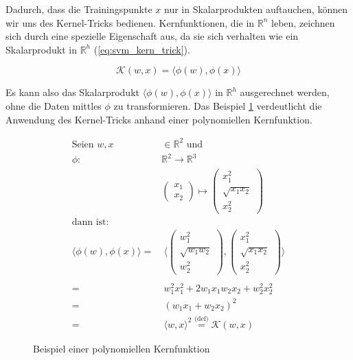 Dadurch, dass die Trainingspunkte $x$ nur in Skalarprodukten auftauchen, können wir uns des Kernel-Tricks bedienen.
Kernfunktionen, die in $\mathbb{R}^n$ leben, zeichnen sich durch eine spezielle Eigenschaft aus, da sie sich verhalten wie ein Skalarprodukt in $\mathbb{R}^h$ (\ref{eq:svm_kern_trick}). 

\begin{equation}
\label{eq:svm_kern_trick}
    \mathcal{K}(w,x) = \langle\phi(w),\phi(x)\rangle
\end{equation}

Es kann also das Skalarprodukt $\langle\phi(w),\phi(x)\rangle$ in $\mathbb{R}^h$ ausgerechnet werden, ohne die Daten mittles $\phi$ zu transformieren. 
Das Beispiel \ref{fig:ex_kernel} verdeutlicht die Anwendung des Kernel-Tricks  anhand einer polynomiellen Kernfunktion.

\renewcommand{\figurename}{Bsp.}
\begin{figure}[htbp]
\begin{equation*}
\label{eq:svm_kernel_example}
\begin{split}
    \text{Seien } w,x & \in \mathbb{R}^2 \text{ und}\\
    \phi : & \mathbb{R}^2 \to \mathbb{R}^3\\
    & \begin{pmatrix}
    x_1 \\
    x_2
    \end{pmatrix}
    \mapsto
    \begin{pmatrix}
    x_1^2 \\
    \sqrt{x_1x_2} \\
    x_2^2
    \end{pmatrix}\\
    \text{dann ist:} &\\
    \langle \phi(w),\phi(x) \rangle = & \:\langle \begin{pmatrix}
    w_1^2 \\
    \sqrt{w_1w_2} \\
    w_2^2
    \end{pmatrix},
    \begin{pmatrix}
    x_1^2 \\
    \sqrt{x_1x_2} \\
    x_2^2
    \end{pmatrix} \rangle \\
    \\
    = & \:w_1^2x_1^2 + 2 w_1x_1w_2x_2 + w_2^2x_2^2 \\
    = & \:(w_1x_1 + w_2x_2)^2 \\
    = & \:\langle w,x \rangle^2 \overset{\text{(def)}}= \mathcal{K}(w,x)
\end{split}
\end{equation*}
    \caption{Beispiel einer polynomiellen Kernfunktion}
    \label{fig:ex_kernel}
\end{figure}
\renewcommand{\figurename}{Abb.}

